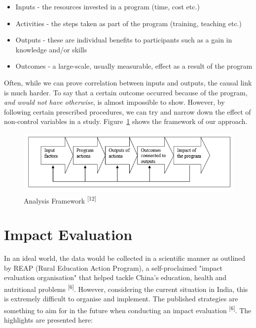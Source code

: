 \documentclass[a4paper, 10pt]{article}
\begin{document}
\begin{itemize}
\item Inputs - the resources invested in a program (time, cost etc.)
\item Activities - the steps taken as part of the program (training, teaching etc.)
\item Outputs - these are individual benefits to participants such as a gain in knowledge and/or skills
\item Outcomes - a large-scale, usually measurable, effect as a result of the program
\end{itemize}

\noindent Often, while we can prove correlation between inputs and outputs, the causal link is much harder. To say that a certain outcome occurred because of the program, \textit{and would not have otherwise}, is almost impossible to show. However, by following certain prescribed procedures, we can try and narrow down the effect of non-control variables in a study. Figure~\ref{fig:framework} shows the framework of our approach.

\begin{figure}[h]
	\centering
	\centerline{
		\includegraphics[scale=0.75]{framework.png}
	}
	\caption{Analysis Framework \textsuperscript{[12]}}
    \label{fig:framework}
\end{figure}

\section*{Impact Evaluation}

In an ideal world, the data would be collected in a scientific manner as outlined by REAP (Rural Education Action Program), a self-proclaimed "impact evaluation organisation" that helped tackle China's education, health and nutritional problems \textsuperscript{[6]}. However, considering the current situation in India, this is extremely difficult to organise and implement. The published strategies are something to aim for in the future when conducting an impact evaluation \textsuperscript{[6]}. The highlights are presented here:
\end{document}
